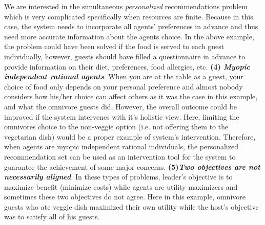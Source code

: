 \documentclass[11pt, letterpaper]{article}
\begin{document}
We are interested in the simultaneous \emph{personalized} recommendations problem which is very complicated specifically when resources are finite. Because
in this case, the system needs to incorporate all agents' preferences in advance and thus need more accurate information about the agents choice. 
In the above example, the problem could have been solved if the food is served to each guest individually, however, guests should have filled a questionnaire in advance to provide information on their diet, preferences, food allergies, etc.  \textbf{(4) \emph{Myopic independent rational agents}}. When you are at the table as a guest, your choice of food only depends on your personal preference and almost nobody considers how his/her choice can affect others as it was the case in this example, and what the omnivore guests did. However, the overall outcome could be improved if the system intervenes with it's holistic view. Here, limiting the omnivores choice to the non-veggie option (i.e. not offering them to the vegetarian dish) would be a proper example of system's intervention.
Therefore, when agents are myopic independent rational individuals, the personalized recommendation set can be used as an intervention tool for the system to guarantee the achievement of some major concerns.
\textbf{(5)\emph{Two objectives are not necessarily aligned}}. In these types of problems, leader's objective is to maximize benefit (minimize costs) while agents are utility maximizers and sometimes these two objectives do not agree. Here in this example, omnivore guests who ate veggie dish maximized their own utility while the host's objective was to satisfy all of his guests.  
\end{document}
